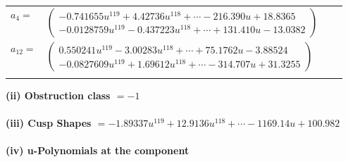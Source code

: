 \documentclass[1p]{elsarticle_modified}
\theoremstyle{definition}
\begin{document}
\begin{tabular}{m{7pt} m{180pt} m{7pt} m{180pt} }
\flushright $a_{4}=$&$\begin{pmatrix}-0.741655 u^{119}+4.42736 u^{118}+\cdots-216.390 u+18.8365\\-0.0128759 u^{119}-0.437223 u^{118}+\cdots+131.410 u-13.0382\end{pmatrix}$ \\
\flushright $a_{12}=$&$\begin{pmatrix}0.550241 u^{119}-3.00283 u^{118}+\cdots+75.1762 u-3.88524\\-0.0827609 u^{119}+1.69612 u^{118}+\cdots-314.707 u+31.3255\end{pmatrix}$\\&\end{tabular}
\flushleft \textbf{(ii) Obstruction class $= -1$}\\~\\
\flushleft \textbf{(iii) Cusp Shapes $= -1.89337 u^{119}+12.9136 u^{118}+\cdots-1169.14 u+100.982$}\\~\\
\newpage\renewcommand{\arraystretch}{1}
\flushleft \textbf{(iv) u-Polynomials at the component}\newline \\
\end{document}
